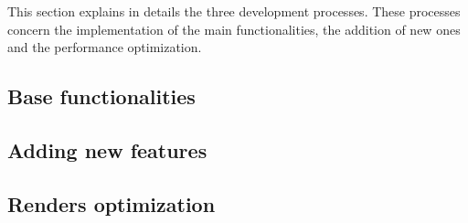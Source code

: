 This section explains in details the three development processes. These processes concern the implementation of the main functionalities, the addition of new ones and the performance optimization.
\subsection{Base functionalities}
\label{subsec:BaseFunctionalities}


\subsection{Adding new features}
\label{subsec:AddingNewFeatures}


\subsection{Renders optimization}
\label{subsec:RendersOptimization}

